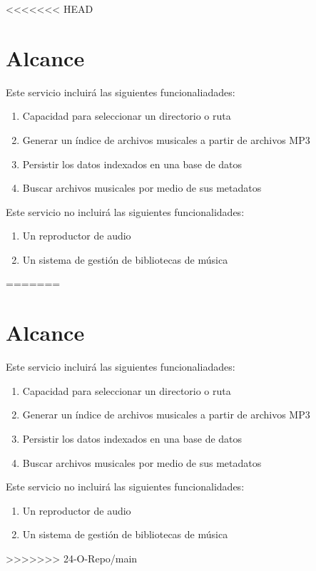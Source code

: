 <<<<<<< HEAD

\section*{Alcance}

\noindent Este servicio incluirá las siguientes funcionaliadades: 
\begin{enumerate}
  \item Capacidad para seleccionar un directorio o ruta
  \item Generar un índice de archivos musicales a partir de archivos MP3
  \item Persistir los datos indexados en una base de datos
  \item Buscar archivos musicales por medio de sus metadatos
\end{enumerate}

\noindent Este servicio no incluirá las siguientes funcionalidades:
\begin{enumerate}
  \item Un reproductor de audio
  \item Un sistema de gestión de bibliotecas de música
\end{enumerate}


=======

\section*{Alcance}

\noindent Este servicio incluirá las siguientes funcionaliadades: 
\begin{enumerate}
  \item Capacidad para seleccionar un directorio o ruta
  \item Generar un índice de archivos musicales a partir de archivos MP3
  \item Persistir los datos indexados en una base de datos
  \item Buscar archivos musicales por medio de sus metadatos
\end{enumerate}

\noindent Este servicio no incluirá las siguientes funcionalidades:
\begin{enumerate}
  \item Un reproductor de audio
  \item Un sistema de gestión de bibliotecas de música
\end{enumerate}


>>>>>>> 24-O-Repo/main
